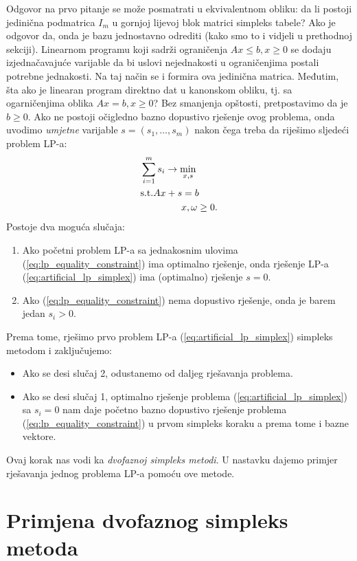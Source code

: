 \documentclass[a4paper, utf8, 11pt, colorlinks]{book}
\begin{document}
 Odgovor na prvo pitanje se može posmatrati u ekvivalentnom obliku: da li postoji jedinična podmatrica $I_m$ u gornjoj lijevoj blok matrici simpleks tabele? Ako je odgovor da,  onda je bazu jednostavno odrediti (kako smo to i vidjeli u prethodnoj sekciji). 
 Linearnom programu koji sadrži ograničenja $Ax \leq b, x\geq 0$ se dodaju izjednačavajuće varijable da bi uslovi nejednakosti u ograničenjima postali potrebne jednakosti. Na taj način se i formira ova jedinična matrica. Međutim, šta ako je linearan program direktno dat u kanonskom obliku, tj. sa ogarničenjima oblika $Ax = b, x \geq 0$? Bez smanjenja opštosti, pretpostavimo da je $b \geq 0$. Ako ne postoji očigledno bazno dopustivo rješenje ovog problema, onda uvodimo \emph{umjetne} varijable $s = (s_1,\ldots, s_m)$ nakon čega treba da riješimo sljedeći problem LP-a:
 \begin{align}
      &\sum_{i=1}^m s_i \rightarrow \min_{x,s} \nonumber \\
      &\mbox{s.t.} A x + s = b \nonumber \\
      & \hspace{1.5cm} x, \omega \geq 0. \label{eq:artificial_lp_simplex}
 \end{align}
Postoje dva moguća slučaja:
\begin{enumerate}
    \item Ako početni problem LP-a sa jednakosnim ulovima (\ref{eq:lp_equality_constraint}) 
          ima optimalno rješenje, onda   rješenje LP-a (\ref{eq:artificial_lp_simplex}) ima (optimalno) rješenje $s = 0$. 
    \item Ako  (\ref{eq:lp_equality_constraint}) nema dopustivo rješenje, onda je barem jedan $s_i > 0$.
\end{enumerate}
 Prema tome, rješimo prvo problem LP-a  (\ref{eq:artificial_lp_simplex}) simpleks metodom i zaključujemo:
 \begin{itemize}
      \item Ako se desi slučaj 2, odustanemo od daljeg rješavanja problema.
      \item Ako se desi slučaj 1, optimalno rješenje problema (\ref{eq:artificial_lp_simplex}) sa $s_i=0$ nam daje početno bazno dopustivo rješenje problema (\ref{eq:lp_equality_constraint}) u prvom simpleks koraku a prema tome i bazne vektore. 
 \end{itemize} 
 Ovaj korak nas vodi ka \emph{dvofaznoj simpleks metodi}. U nastavku dajemo primjer rješavanja jednog problema LP-a pomoću ove metode.      
      
 \section{Primjena dvofaznog simpleks metoda}     
 
\end{document}
